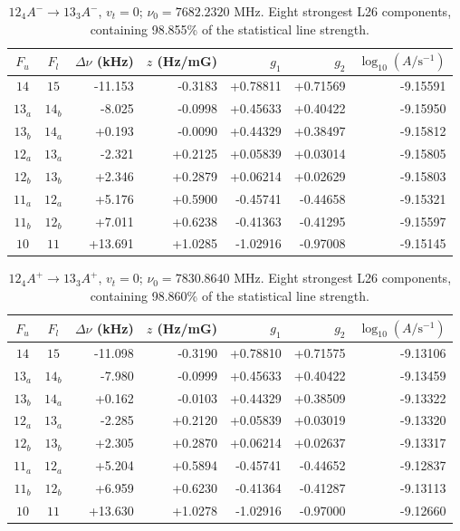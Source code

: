 \begin{table}[!htbp]
\centering\small\renewcommand{\arraystretch}{1.1}\setlength{\tabcolsep}{5pt}
\caption{$12_{4} A^{-}\rightarrow 13_{3} A^{-}$, $v_t=0$; $\nu_0=7682.2320$ MHz. Eight strongest L26 components, containing 98.855\% of the statistical line strength.}
\label{tab:sm-zeeman-7p68}
\begin{tabular}{ccrrrrr}
\hline\hline
$F_u$ & $F_l$ & $\Delta\nu$ (kHz) & $z$ (Hz/mG) & $g_1$ & $g_2$ & $\log_{10}(A/\mathrm{s}^{-1})$ \\
\hline
$14$ & $15$ & -11.153 & -0.3183 & +0.78811 & +0.71569 & -9.15591\\
$13_{a}$ & $14_{b}$ & -8.025 & -0.0998 & +0.45633 & +0.40422 & -9.15950\\
$13_{b}$ & $14_{a}$ & +0.193 & -0.0090 & +0.44329 & +0.38497 & -9.15812\\
$12_{a}$ & $13_{a}$ & -2.321 & +0.2125 & +0.05839 & +0.03014 & -9.15805\\
$12_{b}$ & $13_{b}$ & +2.346 & +0.2879 & +0.06214 & +0.02629 & -9.15803\\
$11_{a}$ & $12_{a}$ & +5.176 & +0.5900 & -0.45741 & -0.44658 & -9.15321\\
$11_{b}$ & $12_{b}$ & +7.011 & +0.6238 & -0.41363 & -0.41295 & -9.15597\\
$10$ & $11$ & +13.691 & +1.0285 & -1.02916 & -0.97008 & -9.15145\\
\hline\end{tabular}
\end{table}

\begin{table}[!htbp]
\centering\small\renewcommand{\arraystretch}{1.1}\setlength{\tabcolsep}{5pt}
\caption{$12_{4} A^{+}\rightarrow 13_{3} A^{+}$, $v_t=0$; $\nu_0=7830.8640$ MHz. Eight strongest L26 components, containing 98.860\% of the statistical line strength.}
\label{tab:sm-zeeman-7p83}
\begin{tabular}{ccrrrrr}
\hline\hline
$F_u$ & $F_l$ & $\Delta\nu$ (kHz) & $z$ (Hz/mG) & $g_1$ & $g_2$ & $\log_{10}(A/\mathrm{s}^{-1})$ \\
\hline
$14$ & $15$ & -11.098 & -0.3190 & +0.78810 & +0.71575 & -9.13106\\
$13_{a}$ & $14_{b}$ & -7.980 & -0.0999 & +0.45633 & +0.40422 & -9.13459\\
$13_{b}$ & $14_{a}$ & +0.162 & -0.0103 & +0.44329 & +0.38509 & -9.13322\\
$12_{a}$ & $13_{a}$ & -2.285 & +0.2120 & +0.05839 & +0.03019 & -9.13320\\
$12_{b}$ & $13_{b}$ & +2.305 & +0.2870 & +0.06214 & +0.02637 & -9.13317\\
$11_{a}$ & $12_{a}$ & +5.204 & +0.5894 & -0.45741 & -0.44652 & -9.12837\\
$11_{b}$ & $12_{b}$ & +6.959 & +0.6230 & -0.41364 & -0.41287 & -9.13113\\
$10$ & $11$ & +13.630 & +1.0278 & -1.02916 & -0.97000 & -9.12660\\
\hline\end{tabular}
\end{table}

